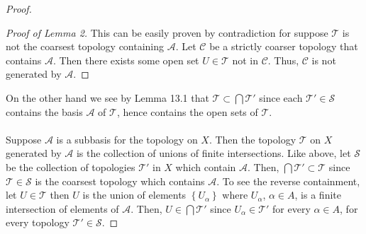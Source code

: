 \begin{proof}
\begin{proof}[Proof of Lemma 2]
\renewcommand\qedsymbol{$\vardiamondsuit$}
This can be easily proven by contradiction for suppose
$\mathcal{T}$ is not the coarsest topology containing
$\mathcal{A}$. Let $\mathcal{C}$ be a strictly coarser topology
that contains $\mathcal{A}$. Then there exists some open set
$U\in\mathcal{T}$ not in $\mathcal{C}$. Thus, $\mathcal{C}$ is
not generated by $\mathcal{A}$.
\end{proof}
On the other hand we see by Lemma 13.1 that
$\mathcal{T}\subset\bigcap\mathcal{T}'$ since each
$\mathcal{T}'\in\mathcal{S}$ contains the basis $\mathcal{A}$ of
$\mathcal{T}$, hence contains the open sets of $\mathcal{T}$.
\\\\
Suppose $\mathcal{A}$ is a subbasis for the topology on $X$. Then
the topology $\mathcal{T}$ on $X$ generated by $\mathcal{A}$ is
the collection of unions of finite intersections. Like above, let
$\mathcal{S}$ be the collection of topologies $\mathcal{T}'$ in
$X$ which contain $\mathcal{A}$. Then,
$\bigcap\mathcal{T}'\subset\mathcal{T}$ since
$\mathcal{T}\in\mathcal{S}$ is the coarsest topology which
contains $\mathcal{A}$. To see the reverse containment, let
$U\in\mathcal{T}$ then $U$ is the union of elements
$\left\{U_\alpha\right\}$ where $U_\alpha$, $\alpha\in A$, is a
finite intersection of elements of $\mathcal{A}$. Then,
$U\in\bigcap\mathcal{T}'$ since $U_\alpha\in\mathcal{T}'$
for every $\alpha\in A$, for every topology
$\mathcal{T}'\in\mathcal{S}$.
\end{proof}
\newpage

